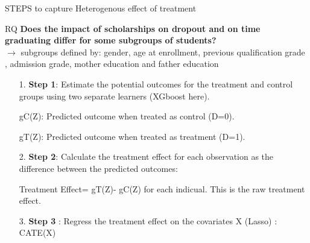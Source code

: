 \documentclass[aspectratio=169]{beamer}
\begin{document}
\begin{frame}{STEPS to capture Heterogenous effect of treatment}
 \begin{alertblock}{RQ}
	\textbf{Does the impact of scholarships on dropout and on time graduating differ for some subgroups of students? \\}
$\rightarrow$ subgroups defined by: gender, age at enrollment, previous qualification grade , admission grade, mother education and father education
    
	\end{alertblock}

\begin{itemize}
    \item[1.] \textbf{Step 1}: Estimate the potential outcomes for the treatment and control groups using two separate learners (XGboost here).

gC(Z): Predicted outcome when treated as control (D=0).

gT(Z): Predicted outcome when treated as treatment (D=1).


    \item[2.] \textbf{Step 2}: Calculate the treatment effect for each observation as the difference between the predicted outcomes:

Treatment Effect= gT(Z)- gC(Z) for each indicual. This is the raw treatment effect.


    \item[3.] \textbf{Step 3} : Regress the treatment effect on the covariates X (Lasso) : CATE(X)
\end{itemize}

    
\end{frame}
    
\end{document}
